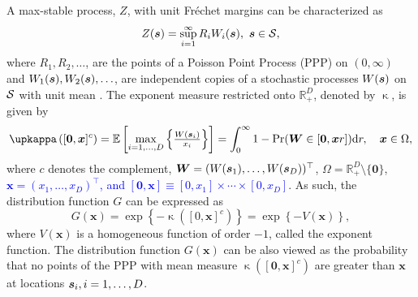 \documentclass[12pt]{article}
\newcommand{\PZ}{\textcolor{blue}}
\begin{document}
A max-stable process, $Z$,  with unit Fr\'{e}chet margins can be characterized as
\begin{equation}
\label{eq:spectralrepresentation}
	Z({\boldsymbol{s}}) = \sup_{i=1}^\infty R_iW_i({\boldsymbol{s}}),\ {\boldsymbol{s}}\in{\mathcal{S}}, 
\end{equation}
%
where $R_1, R_2, \ldots$, are the points of a Poisson Point Process (PPP) on $(0, \infty)$ 
and $W_1({\boldsymbol{s}}), W_2({\boldsymbol{s}}), \ldots$, are independent copies of a stochastic processes $W({\boldsymbol{s}})$ on ${\mathcal{S}}$ with unit mean \citep{deHaan.Ferreira:2006, Schlather:2002}.
%
The exponent measure restricted onto $\mathbb R^D_+$, denoted by $\upkappa$, is given by
%
\begin{equation}
\label{eq:exponentmeasure}
\upkappa \left([\bm 0,\bm x]^c\right)
= \mathbb E\left[\max_{i=1, \ldots, D} \left\{\frac{W(\bs_i)}{x_i}\right\} \right] 
= \int_0^\infty 1 - \Pr(\bm W \in [\bm 0,\bm xr ])\text dr,	
\quad \bx \in \Omega,
\end{equation}
%
where $c$ denotes the complement, $\bm W=(W({\boldsymbol{s}}_1),\dots,W({\boldsymbol{s}}_D))^\top$, $\Omega = \mathbb R^{D}_+ \setminus \{\bm 0\}$, \PZ{$\bm x=(x_1,\dots,x_D)^\top$, and $[\bm 0,\bm x] \equiv [0,x_1]\times \cdots \times [0,x_D]$}. As such, the distribution function $G$ can be expressed as
\begin{equation}
\label{eq:ppp}
G(\bm x) = \exp\left\{-\upkappa([0,\bm x]^c)\right\} = \exp\left\{-V(\bm x)\right\},
\end{equation}
%
where $V(\bm x)$ is a homogeneous function of order $-1$, called the exponent function. The distribution function $G(\bm x)$ can be also viewed as the probability that no points of the PPP with mean measure $\upkappa \left([\bm 0,\bm x]^c\right)$ are greater than $\bm x$ at locations ${\boldsymbol{s}}_i,i=1,\dots,D$.     
\end{document}
